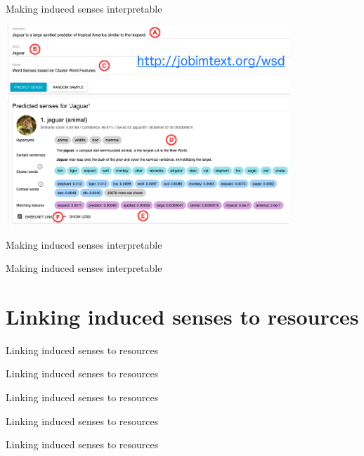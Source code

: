 \documentclass[usenames,dvipsnames]{beamer}
\begin{document}
\begin{frame}{ Making induced senses interpretable }

\vspace{-1em}
	\begin{center}
	\includegraphics[width=0.8\textwidth]{emnlp_single}
	\end{center}	

	
\end{frame}


\begin{frame}{ Making induced senses interpretable }
	
\end{frame}


\begin{frame}{ Making induced senses interpretable }
	
\end{frame}


\section{Linking induced senses to resources}

\begin{frame}{ Linking induced senses to resources }
	
\end{frame}


\begin{frame}{ Linking induced senses to resources }
	
\end{frame}


\begin{frame}{ Linking induced senses to resources }
	
\end{frame}


\begin{frame}{ Linking induced senses to resources }
	
\end{frame}


\begin{frame}{ Linking induced senses to resources }
	
\end{frame}

% 



\end{document}

